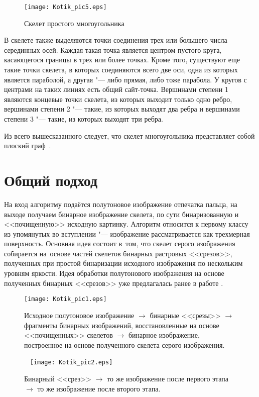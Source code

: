 \documentclass[twoside]{article}
\begin{document}
\begin{figure}[t]
  \centering
   \texttt{[image: Kotik\_pic5.eps]}
  \caption{Скелет простого многоугольника}
  \label{pic2}
\end{figure}

В скелете также выделяются точки соединения трех или большего числа серединных осей. Каждая такая точка является центром пустого круга, касающегося границы в трех или более точках. Кроме того, существуют еще такие точки скелета, в которых соединяются всего две оси, одна из которых является параболой, а другая "--- либо прямая, либо тоже парабола. У кругов с центрами на таких линиях есть общий сайт-точка.
Вершинами степени 1 являются концевые точки скелета, из которых выходит только одно ребро, вершинами степени 2 "--- такие, из которых выходят два ребра и вершинами степени 3 "--- такие, из которых выходят три ребра.

Из всего вышесказанного следует, что скелет многоугольника представляет собой плоский граф~\cite{bib1,bib2}.

\section{Общий подход}
На вход алгоритму подаётся полутоновое изображение отпечатка пальца, на выходе получаем бинарное изображение скелета, по сути бинаризованную и <<почищенную>> исходную картинку. Алгоритм относится к первому классу из упомянутых во вступлении "--- изображение рассматривается как трехмерная поверхность. Основная идея состоит в~том, что скелет серого изображения собирается на~основе частей скелетов бинарных растровых <<срезов>>, полученных при простой бинаризации исходного изображения по нескольким уровням яркости. Идея обработки полутонового изображения на основе полученных бинарных <<срезов>> уже предлагалась ранее в работе \cite{bib3}.

\begin{figure}[t]
    \centering
    \texttt{[image: Kotik\_pic1.eps]}
    \caption{Исходное полутоновое  изображение
    $\to$ бинарные <<срезы>>
    $\to$ фрагменты бинарных изображений, восстановленные на основе <<почищенных>> скелетов
    $\to$ бинарное изображение, построенное на основе полученного скелета серого изображения.}
    \label{pic3}
    \medskip
    ~\hskip3mm
    \texttt{[image: Kotik\_pic2.eps]}
    \caption{Бинарный <<срез>> $\to$ то же изображение после первого этапа $\to$ то же изображение после второго \mbox{этапа}.}
    \label{pic4}
\end{figure}
\end{document}
